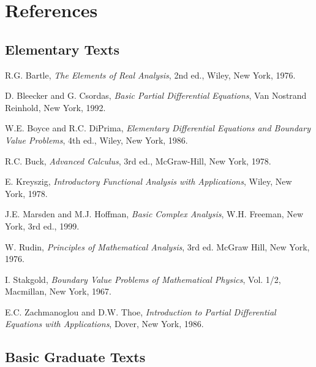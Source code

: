 \clearpage\appendix\section{References}\label{chap:source-reference-appendix}

\subsection{Elementary Texts}\label{sec:references-elementary-texts}

\begin{list}{}{\setlength{\labelwidth}{3em}\setlength{\leftmargin}{4em}\setlength{\labelsep}{.8em}}
\item[{[Bar]}] R.G. Bartle, \emph{The Elements of Real Analysis}, 2nd ed., Wiley, New York, 1976.

\item[{[BC]}] D. Bleecker and G. Csordas, \emph{Basic Partial Differential Equations}, Van Nostrand Reinhold, New York, 1992.

\item[{[BD]}] W.E. Boyce and R.C. DiPrima, \emph{Elementary Differential Equations and Boundary Value Problems}, 4th ed., Wiley, New York, 1986.

\item[{[Bu]}] R.C. Buck, \emph{Advanced Calculus}, 3rd ed., McGraw-Hill, New York, 1978.

\item[{[Kr]}] E. Kreyszig, \emph{Introductory Functional Analysis with Applications}, Wiley, New York, 1978.

\item[{[MH]}] J.E. Marsden and M.J. Hoffman, \emph{Basic Complex Analysis}, W.H. Freeman, New York, 3rd ed., 1999.

\item[{[Rud]}] W. Rudin, \emph{Principles of Mathematical Analysis}, 3rd ed. McGraw Hill, New York, 1976.

\item[{[Stak]}] I. Stakgold, \emph{Boundary Value Problems of Mathematical Physics}, Vol. 1/2, Macmillan, New York, 1967.

\item[{[ZT]}] E.C. Zachmanoglou and D.W. Thoe, \emph{Introduction to Partial Differential Equations with Applications}, Dover, New York, 1986.
\end{list}

\subsection{Basic Graduate Texts}\label{sec:references-basic-graduate-texts}

